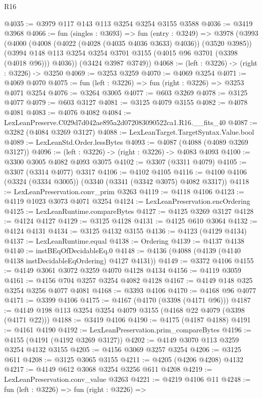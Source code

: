 \begin{lexlean}{R16}
\begin{coremodule}
@4035 := @3979 @117 @143 @113 @3254 @3254 @3155 @3588
@4036 := @3419 @3968
@4066 := fun (singles : @3693) =>
  fun (entry : @3249) =>
  @3978
    (@3993
      (@4000
        (@4008 (@4022 (@4028 (@4035 @4036 @3633) @4036)) (@3520 @3985))
        (@3994 @148 @113 @3254 @3254 @3701 @3155 (@4015 @96 @3701 (@3398 (@4018 @96))) @4036))
      (@3424 @3987 @3749))
@4068 := (left : @3226) -> (right : @3226) -> @3250
@4069 := @3253 @3259
@4070 := @4069 @3254
@4071 := @4069 @4070
@4075 := fun (left : @3226) => fun (right : @3226) => @3253 @4071 @3254
@4076 := @3264 @3005
@4077 := @603 @3269
@4078 := @3125 @4077
@4079 := @603 @3127
@4081 := @3125 @4079 @3155
@4082 := @4078 @4081
@4083 := @4076 @4082
@4084 := LexLeanPreserve.C029d7d042ae895a2d072083090522ca1.R16.__fits_40
@4087 := @3282 (@4084 @3269 @3127)
@4088 := LexLeanTarget.TargetSyntax.Value.bool
@4089 := LexLeanStd.Order.lessBytes
@4093 := @4087 (@4088 (@4089 @3269 @3127))
@4096 := (left : @3226) -> (right : @3226) -> @4083 @4093
@4100 := @3300 @3005 @4082 @4093 @3075
@4102 := @3307 (@3311 @4079)
@4105 := @3307 (@3314 @4077) @3317
@4106 := @4102 @4105
@4116 := @4100 @4106 (@3324 (@3334 @3005)) (@3340 (@3341 (@3342 @3075) @4082 @3317))
@4118 := LexLeanPreservation.conv_prim @3263
@4119 := @4118 @4106
@4123 := @4119 @1023 @3073 @4071 @3254
@4124 := LexLeanPreservation.encOrdering
@4125 := LexLeanRuntime.compareBytes
@4127 := @4125 @3269 @3127
@4128 := @4124 @4127
@4129 := @3125 @4128
@4131 := @4125 @610 @3064
@4132 := @4124 @4131
@4134 := @3125 @4132 @3155
@4136 := @4123 (@4129 @4134)
@4137 := LexLeanRuntime.equal
@4138 := Ordering
@4139 := @4137 @4138
@4140 := instBEqOfDecidableEq.{0}
@4148 := @4136 (@4088 (@4139 (@4140 @4138 instDecidableEqOrdering) @4127 @4131))
@4149 := @3372 @4106
@4155 := @4149 @3061 @3072 @3259 @4070 @4128 @4134
@4156 := @4119 @3059
@4161 := @4156 @704 @3257 @3254 @4082 @4128
@4167 := @4149 @148 @325 @3254 @3256 @4077 @4081
@4168 := @3393 @4106
@4170 := @4168 @96 @4077
@4171 := @3399 @4106
@4175 := @4167 (@4170 (@3398 (@4171 @96)))
@4187 := @4149 @198 @113 @3254 @3254 @4079 @3155 (@4168 @22 @4079 (@3398 (@4171 @22)))
@4188 := @3419 @4106
@4190 := @4175 (@4187 @4188)
@4191 := @4161 @4190
@4192 := LexLeanPreservation.prim_compareBytes
@4196 := @4155 (@4191 (@4192 @3269 @3127))
@4202 := @4149 @3070 @113 @3259 @3254 @4132 @3155
@4205 := @4156 @3069 @3257 @3254
@4206 := @3125 @611
@4208 := @3125 @3065 @3155
@4211 := @4205 (@4206 @4208) @4132
@4217 := @4149 @612 @3068 @3254 @3256 @611 @4208
@4219 := LexLeanPreservation.conv_value @3263
@4221 := @4219 @4106 @11
@4248 := fun (left : @3226) =>
  fun (right : @3226) =>

\end{coremodule}
\end{lexlean}
